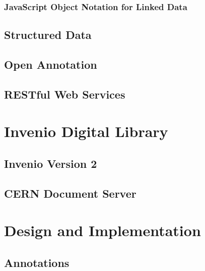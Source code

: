 \documentclass[12pt,a4paper,twoside]{report}
\begin{document}
      \subsubsection{JavaScript Object Notation for Linked Data}
        \label{sec:json}
        

    \subsection{Structured Data}
      \label{sec:sd}
      

    \subsection{Open Annotation}
      \label{sec:oa}
      

    \subsection{RESTful Web Services}
      \label{sec:rest}
      

  \clearpage

  \section{Invenio Digital Library}
    \label{sec:invenio}
    

    \subsection{Invenio Version 2}
      \label{sec:v2}
      

    \subsection{CERN Document Server}
      \label{sec:cds}
      

  \clearpage

  \section{Design and Implementation}
    \label{sec:impl}
    

    \subsection{Annotations}
      \label{sec:anno}
      
\end{document}
